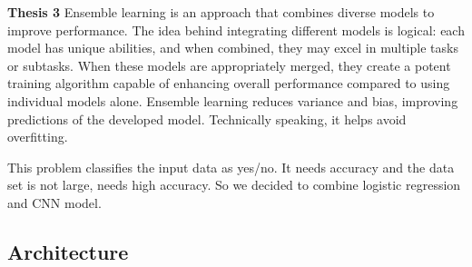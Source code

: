 \textbf{Thesis 3}
Ensemble learning is an approach that combines diverse models to improve performance. The idea behind integrating different models is logical: each model has unique abilities, and when combined, they may excel in multiple tasks or subtasks. When these models are appropriately merged, they create a potent training algorithm capable of enhancing overall performance compared to using individual models alone.
Ensemble learning reduces variance and bias, improving predictions of the developed model. Technically speaking, it helps avoid overfitting.

This problem classifies the input data as yes/no. It needs accuracy and the data set is not large, needs high accuracy. So we decided to combine logistic regression and CNN model.



\subsection{Architecture}
\label{architecture design}

